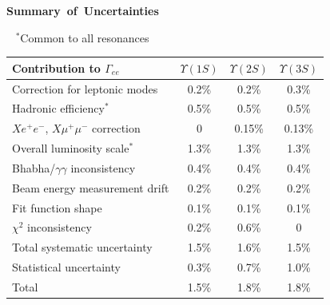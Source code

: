 \documentclass[landscape]{article}
\newenvironment{slide}[1][ ]{\mbox{\bf #1 } \vfill}{\vfill \mbox{ } \hfill \Large \arabic{page} \pagebreak}
\newcommand{\gee}{{\boldmath $\Gamma_{ee}$}}
\newcommand{\us}{$\Upsilon(1S)$}
\newcommand{\uss}{$\Upsilon(2S)$}
\newcommand{\usss}{$\Upsilon(3S)$}
\begin{document}
\begin{slide}[Summary of Uncertainties]

\vspace{-1.6 cm}
\mbox{ } \hfill {\color{blue} $^*$Common to all resonances}

\vspace{1.6 cm}
\begin{center}
  \renewcommand{\arraystretch}{1.5}
  \begin{tabular}{l c c c}
    \hline\hline Contribution to \gee & \hspace{0.5 cm}\us\hspace{0.5 cm} & \hspace{0.5 cm}\uss\hspace{0.5 cm} & \hspace{0.5 cm}\usss\hspace{0.5 cm} \\\hline
    Correction for leptonic modes        	   & 0.2\%  & 0.2\%  & 0.3\%  \\
    {\color{blue} Hadronic efficiency$^*$} & {\color{blue} 0.5\%}  & {\color{blue} 0.5\%}  & {\color{blue} 0.5\%}  \\
    $Xe^+e^-$, $X\mu^+\mu^-$ correction  	   & 0      & 0.15\% & 0.13\% \\
    {\color{blue} Overall luminosity scale$^*$} & {\color{blue} 1.3\%}  & {\color{blue} 1.3\%}  & {\color{blue} 1.3\%}  \\
    Bhabha/$\gamma\gamma$ inconsistency  	   & 0.4\%  & 0.4\%  & 0.4\%  \\
    Beam energy measurement drift \hspace{0.5 cm}  & 0.2\%  & 0.2\%  & 0.2\%  \\
    Fit function shape                   	   & 0.1\%  & 0.1\%  & 0.1\%  \\
    $\chi^2$ inconsistency               	   & 0.2\%  & 0.6\%  & 0      \\\hline
    Total systematic uncertainty         	   & {\color{red} 1.5\%}  & {\color{red} 1.6\%}  & {\color{red} 1.5\%}  \\
    Statistical uncertainty              	   & 0.3\%  & 0.7\%  & 1.0\%  \\\hline
    Total                                	   & {\color{red} 1.5\%}  & {\color{red} 1.8\%}  & {\color{red} 1.8\%}  \\\hline\hline
  \end{tabular}
\end{center}

\end{slide}
\end{document}
